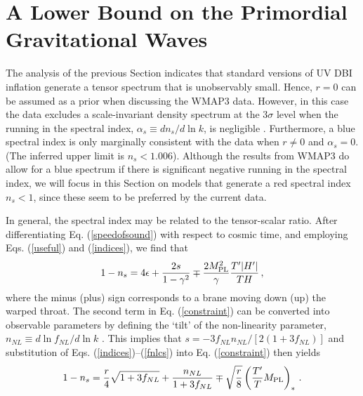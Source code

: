 \section{A Lower Bound on the Primordial Gravitational Waves} 
% 
\label{sec:lower}

The analysis of the previous Section 
indicates that standard versions of UV DBI inflation generate a 
tensor spectrum that is unobservably 
small. Hence, $r=0$ can be assumed as a prior 
when discussing the WMAP3 data. 
However, in this case the data 
excludes a scale-invariant density spectrum at the $3 \sigma$ level
when the running in the spectral index, $\alpha_s \equiv dn_s/d\ln k$, 
is negligible \cite{spergel}.  
Furthermore, a blue spectral index 
is only marginally consistent with the data when $r\ne 0$ and $\alpha_s=0$. 
(The inferred upper limit is $n_s < 1.006$).
Although the results from WMAP3 do allow for a blue spectrum if there is 
significant negative running in the spectral index, we will 
focus in this Section 
on models that generate a red spectral index $n_s<1$, since these seem 
to be preferred by the current data.   

In general, the spectral index may be related to the tensor-scalar ratio. 
After differentiating Eq. (\ref{speedofsound}) 
with respect to cosmic time, and employing Eqs. (\ref{useful}) 
and (\ref{indices}), we find that 
\begin{equation}
\label{constraint}
1-n_s = 4 \epsilon +\frac{2s}{1-\gamma^2} \mp 
\frac{2M_{\mathrm{PL}}^2}{\gamma} \frac{T'|H'|}{TH}  \,,
\end{equation}
where the minus (plus) sign corresponds to 
a brane moving down (up) the warped throat. 
The second term in Eq. (\ref{constraint}) 
can be converted into observable parameters
by defining the `tilt' of the non-linearity parameter, 
$n_{NL} \equiv d \ln f_{NL}/d\ln k$ \cite{brane14}. 
This implies that $s= - 3 f_{NL} n_{NL} /[2(1+3f_{NL})]$ and     
substitution of Eqs. (\ref{indices})--(\ref{fnlcs}) 
into Eq. (\ref{constraint}) then yields
\begin{equation}
\label{obscon1}
1-n_s = \frac{r}{4} \sqrt{1+3f_{NL}} + \frac{n_{NL}}{1+3f_{NL}}
\mp \sqrt{\frac{r}{8}} \left( \frac{T'}{T} M_{\mathrm{PL}} \right)_*  \,.
\end{equation}

